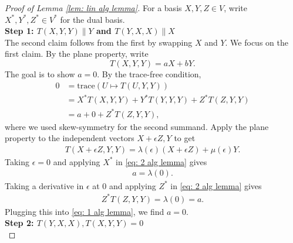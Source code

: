\documentclass{article}
\numberwithin{equation}{section}
\theoremstyle{plain}
\begin{document}
    \begin{proof}[Proof of Lemma \ref{lem: lin alg lemma}]

    For a basis $X,Y,Z \in V$, write $X^*, Y^*, Z^* \in V^*$ for the dual basis. \\
    
    \noindent \textbf{Step 1: $T(X,Y,Y) \| Y$ and $T(Y,X,X) \| X$}\\
    
    The second claim follows from the first by swapping $X$ and $Y$. We focus on the first claim. 
    By the plane property, write 
    \begin{equation}
    T(X,Y,Y) = aX + bY.
    \end{equation}
    The goal is to show $a = 0$. By the trace-free condition, 
    \begin{align} \label{eq: 1 alg lemma}
        0 &= \mathrm{trace}(U \mapsto T(U,Y,Y)) \\
        &=X^*T(X,Y,Y) + Y^*T(Y,Y,Y) + Z^*T(Z,Y,Y) \\
        &= a + 0 + Z^*T(Z,Y,Y),
    \end{align}
    where we used skew-symmetry for the second summand. Apply the plane property to the independent vectors $X + \epsilon Z, Y$ to get 
    \begin{align}\label{eq: 2 alg lemma}
        T(X+ \epsilon Z,Y,Y) = \lambda(\epsilon) (X + \epsilon Z) + \mu(\epsilon) Y. 
    \end{align}
    Taking $\epsilon = 0$ and applying $X^*$ in \eqref{eq: 2 alg lemma} gives 
    \begin{align}
        a = \lambda(0). 
    \end{align}
    Taking a derivative in $\epsilon$ at $0$ and applying $Z^*$ in \eqref{eq: 2 alg lemma} gives 
    \begin{align}
        Z^*T(Z,Y,Y) = \lambda(0) = a.
    \end{align}
    Plugging this into \eqref{eq: 1 alg lemma}, we find $a = 0$.\\


\noindent \textbf{Step 2: $T(Y,X,X), T(X,Y,Y) = 0$}\\


\end{proof}
\end{document}
